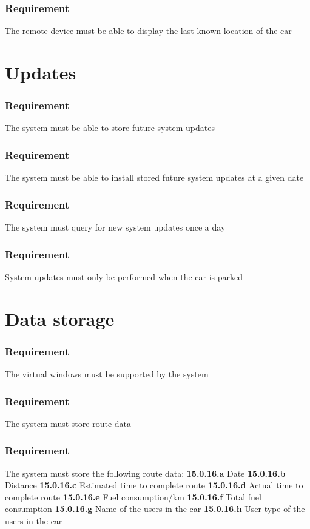 \documentclass{article}
\begin{document}
{    \subsubsection{Requirement}
\hfill \break 
\- \- \-The remote device must be able to display the last known location of the car

\section{Updates}
    \subsubsection{Requirement}
\hfill \break 
\- \- \-The system must be able to store future system updates
    \subsubsection{Requirement}
\hfill \break 
\- \- \-The system must be able to install stored future system updates at a given date
    \subsubsection{Requirement}
\hfill \break 
\- \- \-The system must query for new system updates once a day
    \subsubsection{Requirement}
\hfill \break 
\- \- \-System updates must only be performed when the car is parked

\section{Data storage}
    \subsubsection{Requirement}
\hfill \break 
\- \- \-The virtual windows must be supported by the system
    \subsubsection{Requirement}
\hfill \break 
\- \- \-The system must store route data
    \subsubsection{Requirement}
\hfill \break 
\- \- \-The system must store the following route data:
\hfill \break 
\indent
\textbf{15.0.16.a} Date
\hfill \break 
\indent
\textbf{15.0.16.b} Distance
\hfill \break 
\indent
\textbf{15.0.16.c} Estimated time to complete route
\hfill \break 
\indent
\textbf{15.0.16.d} Actual time to complete route
\hfill \break 
\indent
\textbf{15.0.16.e} Fuel consumption/km
\hfill \break 
\indent
\textbf{15.0.16.f} Total fuel consumption
\hfill \break 
\indent
\textbf{15.0.16.g} Name of the users in the car
\hfill \break 
\indent
\textbf{15.0.16.h} User type of the users in the car


}
\end{document}

